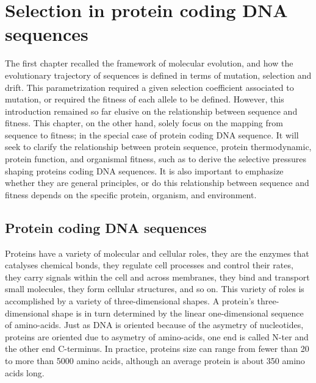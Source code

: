 \chapter{Selection in protein coding \acrshort{DNA} sequences}
\minitoc
\label{sec:selection}
The first chapter recalled the framework of molecular evolution, and how the evolutionary trajectory of sequences is defined in terms of mutation, selection and drift. 
This parametrization required a given selection coefficient associated to mutation, or required the fitness of each \gls{allele} to be defined.
However, this introduction remained so far elusive on the relationship between sequence and fitness.
This chapter, on the other hand, solely focus on the mapping from sequence to fitness; in the special case of protein coding \acrshort{DNA} sequence.
It will seek to clarify the relationship between protein sequence, protein thermodynamic, protein function, and organismal fitness, such as to derive the selective pressures shaping proteins coding \acrshort{DNA} sequences.
It is also important to emphasize whether they are general principles, or do this relationship between sequence and fitness depends on the specific protein, organism, and environment.

\section{Protein coding \acrshort{DNA} sequences}

Proteins have a variety of molecular and cellular roles, they are the enzymes that catalyses chemical bonds, they regulate cell processes and control their rates, they carry signals within the cell and across membranes, they bind and transport small molecules, they form cellular structures, and so on.
This variety of roles is accomplished by a variety of three-dimensional shapes.
A protein's three-dimensional shape is in turn determined by the linear one-dimensional sequence of amino-acids.
Just as \acrshort{DNA} is oriented because of the asymetry of nucleotides, proteins are oriented due to asymetry of amino-acids, one end is called \gls{N-ter} and the other end C-terminus. 
In practice, proteins size can range from fewer than 20 to more than 5000 amino acids, although an average protein is about 350 amino acids long.

